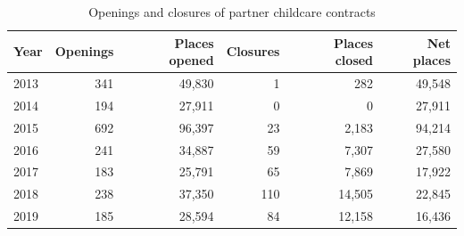 \begin{table}[htbp]\centering
\caption{Openings and closures of partner childcare contracts}
\label{tab:T7b_aber_fech}
\footnotesize
\begin{tabular}{lrrrrr}
\toprule
Year & Openings & Places opened & Closures & Places closed & Net places \\
\midrule
2013 & 341 & 49,830 & 1 & 282 & 49,548 \\
2014 & 194 & 27,911 & 0 & 0 & 27,911 \\
2015 & 692 & 96,397 & 23 & 2,183 & 94,214 \\
2016 & 241 & 34,887 & 59 & 7,307 & 27,580 \\
2017 & 183 & 25,791 & 65 & 7,869 & 17,922 \\
2018 & 238 & 37,350 & 110 & 14,505 & 22,845 \\
2019 & 185 & 28,594 & 84 & 12,158 & 16,436 \\
\bottomrule
\end{tabular}
\end{table}
